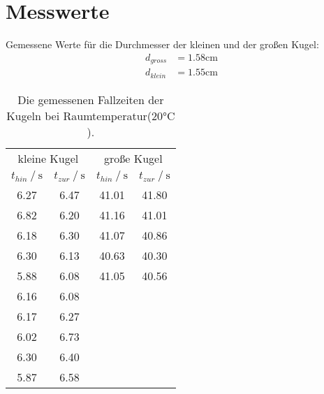 \section{Messwerte}
\label{sec:Messwerte}

Gemessene Werte für die Durchmesser der kleinen und der großen Kugel:
\begin{align*}
    d_{gross} &= 1.58\unit{\centi\meter}\\
    d_{klein} &= 1.55\unit{\centi\meter}
\end{align*}

\begin{table}
    \centering
    \caption{Die gemessenen Fallzeiten der Kugeln bei Raumtemperatur($20\unit{\celsius}$).}
    \begin{tabular}{cccc}
      \toprule
      \multicolumn{2}{c}{kleine Kugel} & \multicolumn{2}{c}{große Kugel} \\
      \cmidrule(lr){1-2} \cmidrule(lr){3-4}
      {$t_{hin} \mathbin{/} \unit{\second}$} &
      {$t_{zur} \mathbin{/} \unit{\second}$} &
      {$t_{hin} \mathbin{/} \unit{\second}$} &
      {$t_{zur} \mathbin{/} \unit{\second}$} \\
      \midrule
        6.27 & 6.47 & 41.01 & 41.80 \\
        6.82 & 6.20 & 41.16 & 41.01 \\
        6.18 & 6.30 & 41.07 & 40.86 \\
        6.30 & 6.13 & 40.63 & 40.30 \\
        5.88 & 6.08 & 41.05 & 40.56 \\
        6.16 & 6.08 \\
        6.17 & 6.27 \\
        6.02 & 6.73 \\
        6.30 & 6.40 \\
        5.87 & 6.58 \\
      \bottomrule
    \end{tabular}
    \label{tab:Tabelle1}
\end{table}

